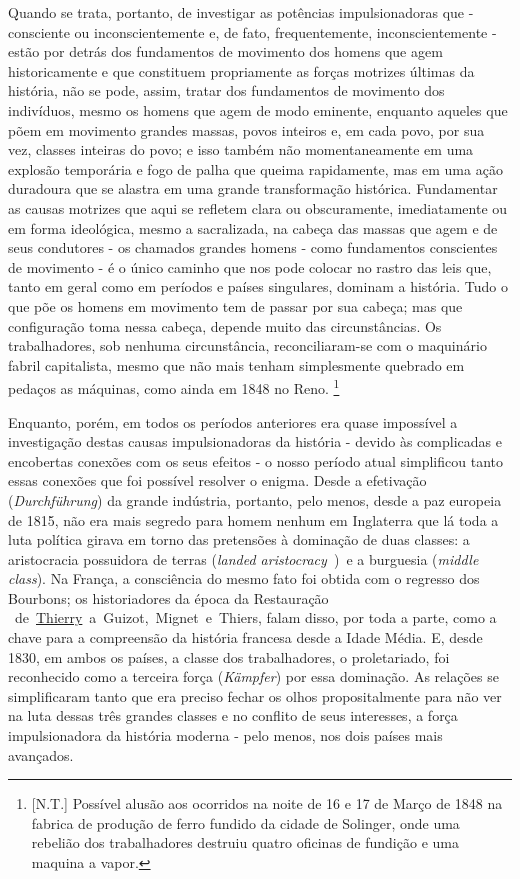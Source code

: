 Quando se trata, portanto, de investigar as potências impulsionadoras
que - consciente ou inconscientemente e, de fato, frequentemente,
inconscientemente - estão por detrás dos fundamentos de movimento dos
homens que agem historicamente e que constituem propriamente as forças
motrizes últimas da história, não se pode, assim, tratar dos fundamentos
de movimento dos indivíduos, mesmo os homens que agem de modo eminente,
enquanto aqueles que põem em movimento grandes massas, povos inteiros e,
em cada povo, por sua vez, classes inteiras do povo; e isso também não
momentaneamente em uma explosão temporária e fogo de palha que queima
rapidamente, mas em uma ação duradoura que se alastra em uma grande
transformação histórica. Fundamentar as causas motrizes que aqui se
refletem clara ou obscuramente, imediatamente ou em forma ideológica,
mesmo a sacralizada, na cabeça das massas que agem e de seus condutores
- os chamados grandes homens - como fundamentos conscientes de movimento
- é o único caminho que nos pode colocar no rastro das leis que, tanto
em geral como em períodos e países singulares, dominam a história. Tudo
o que põe os homens em movimento tem de passar por sua cabeça; mas que
configuração toma nessa cabeça, depende muito das circunstâncias. Os
trabalhadores, sob nenhuma circunstância, reconciliaram-se com o
maquinário fabril capitalista, mesmo que não mais tenham simplesmente
quebrado em pedaços as máquinas, como ainda em 1848 no Reno. \footnote{{[}N.T.{]}
  Possível alusão aos ocorridos na noite de 16 e 17 de Março de 1848 na
  fabrica de produção de ferro fundido da cidade de Solinger, onde uma
  rebelião dos trabalhadores destruiu quatro oficinas de fundição e uma
  maquina a vapor.}

Enquanto, porém, em todos os períodos anteriores era quase impossível a
investigação destas causas impulsionadoras da história - devido às
complicadas e encobertas conexões com os seus efeitos - o nosso período
atual simplificou tanto essas conexões que foi possível resolver o
enigma. Desde a efetivação (\emph{Durchführung}) da grande indústria,
portanto, pelo menos, desde a paz europeia de 1815, não era mais segredo
para homem nenhum em Inglaterra que lá toda a luta política girava em
torno das pretensões à dominação de duas classes: a aristocracia
possuidora de terras (\emph{landed
aristocracy~})\protect\hypertarget{r32}{}{}~e a burguesia (\emph{middle
class}).\protect\hypertarget{r33}{}{} Na França, a consciência do mesmo
fato foi obtida com o regresso dos Bourbons; os historiadores da época
da Restauração\protect\hypertarget{n198}{}{}
~de~\href{https://www.marxists.org/portugues/dicionario/verbetes/t/thierry.htm}{Thierry}~a~Guizot,~Mignet~e~Thiers,
falam disso, por toda a parte, como a chave para a compreensão da
história francesa desde a Idade Média. E, desde 1830, em ambos os
países, a classe dos trabalhadores, o proletariado, foi reconhecido como
a terceira força (\emph{Kämpfer}) por essa dominação. As relações se
simplificaram tanto que era preciso fechar os olhos propositalmente para
não ver na luta dessas três grandes classes e no conflito de seus
interesses, a força impulsionadora da história moderna - pelo menos, nos
dois países mais avançados.

